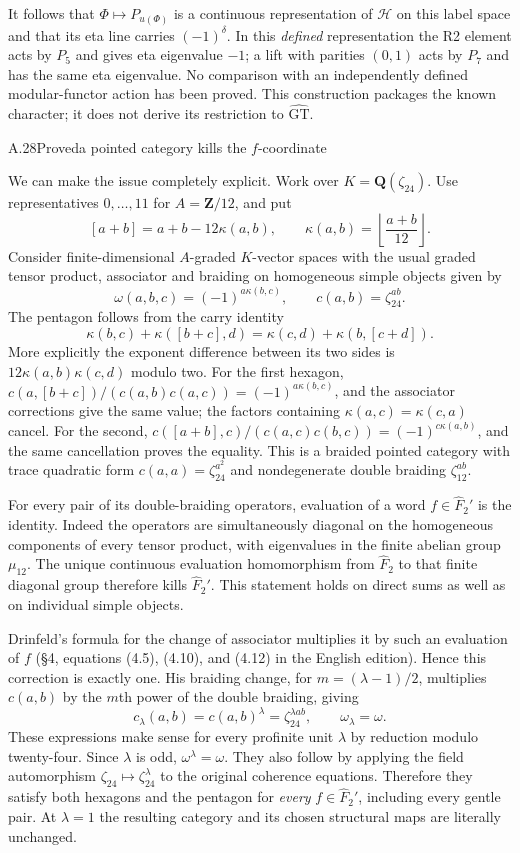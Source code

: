 It follows that $\Phi\mapsto P_{u(\Phi)}$ is a continuous
representation of $\mathcal H$ on this label space and that its eta
line carries $(-1)^\delta$.  In this \emph{defined} representation
the R2 element acts by $P_5$ and gives eta eigenvalue $-1$; a lift
with parities $(0,1)$ acts by $P_7$ and has the same eta eigenvalue.
No comparison with an independently defined modular-functor action
has been proved.  This construction packages the known character;
it does not derive its restriction to $\widehat{\mathrm{GT}}$.

\begin{statement}{A.28}{Proved}{a pointed category kills the $f$-coordinate}
\citep[Section 4]{LitDrinfeld1991}
\end{statement}
We can make the issue completely explicit.  Work over
$K=\mathbf Q(\zeta_{24})$.  Use representatives $0,\ldots,11$
for $A=\mathbf Z/12$, and put
\[
 [a+b]=a+b-12\kappa(a,b),\qquad
 \kappa(a,b)=\left\lfloor\frac{a+b}{12}\right\rfloor.
\]
Consider finite-dimensional $A$-graded $K$-vector spaces with the
usual graded tensor product, associator and braiding on homogeneous
simple objects given by
\[
 \omega(a,b,c)=(-1)^{a\kappa(b,c)},\qquad
 c(a,b)=\zeta_{24}^{ab}.
\]
The pentagon follows from the carry identity
\[
 \kappa(b,c)+\kappa([b+c],d)
 =\kappa(c,d)+\kappa(b,[c+d]).
\]
More explicitly the exponent difference between its two sides is
$12\kappa(a,b)\kappa(c,d)$ modulo two.  For the first hexagon,
$c(a,[b+c])/(c(a,b)c(a,c))=(-1)^{a\kappa(b,c)}$,
and the associator corrections give the same value; the factors
containing $\kappa(a,c)=\kappa(c,a)$ cancel.  For the second,
$c([a+b],c)/(c(a,c)c(b,c))=(-1)^{c\kappa(a,b)}$,
and the same cancellation proves the equality.  This is a braided
pointed category with trace quadratic form
$c(a,a)=\zeta_{24}^{a^2}$ and nondegenerate double braiding
$\zeta_{12}^{ab}$.

For every pair of its double-braiding operators, evaluation of a
word $f\in\widehat F_2'$ is the identity.  Indeed the operators
are simultaneously diagonal on the homogeneous components of every
tensor product, with eigenvalues in the finite abelian group
$\mu_{12}$.  The unique continuous evaluation homomorphism from
$\widehat F_2$ to that finite diagonal group therefore kills
$\widehat F_2'$.  This statement holds on direct sums as well as
on individual simple objects.

Drinfeld's formula for the change of associator multiplies it by
such an evaluation of $f$ (\S4, equations (4.5), (4.10), and (4.12)
in the English edition).  Hence this correction is exactly one.
His braiding change, for $m=(\lambda-1)/2$, multiplies $c(a,b)$ by
the $m$th power of the double braiding, giving
\[
 c_\lambda(a,b)=c(a,b)^{\lambda}
 =\zeta_{24}^{\lambda ab},\qquad \omega_\lambda=\omega.
\]
These expressions make sense for every profinite unit $\lambda$
by reduction modulo twenty-four.  Since $\lambda$ is odd,
$\omega^\lambda=\omega$.  They also follow by applying the
field automorphism $\zeta_{24}\mapsto\zeta_{24}^{\lambda}$ to
the original coherence equations.  Therefore they satisfy both
hexagons and the pentagon for \emph{every} $f\in\widehat F_2'$,
including every gentle pair.  At $\lambda=1$ the resulting category
and its chosen structural maps are literally unchanged.

